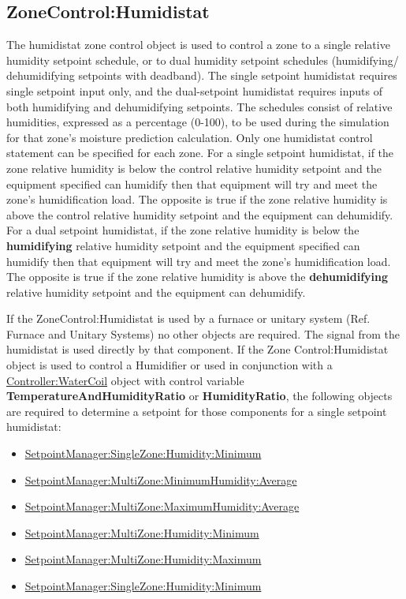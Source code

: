\subsection{ZoneControl:Humidistat}\label{zonecontrolhumidistat}

The humidistat zone control object is used to control a zone to a single relative humidity setpoint schedule, or to dual humidity setpoint schedules (humidifying/ dehumidifying setpoints with deadband). The single setpoint humidistat requires single setpoint input only, and the dual-setpoint humidistat requires inputs of both humidifying and dehumidifying setpoints. The schedules consist of relative humidities, expressed as a percentage (0-100), to be used during the simulation for that zone's moisture prediction calculation. Only one humidistat control statement can be specified for each zone. For a single setpoint humidistat, if the zone relative humidity is below the control relative humidity setpoint and the equipment specified can humidify then that equipment will try and meet the zone's humidification load. The opposite is true if the zone relative humidity is above the control relative humidity setpoint and the equipment can dehumidify. For a dual setpoint humidistat, if the zone relative humidity is below the \textbf{humidifying} relative humidity setpoint and the equipment specified can humidify then that equipment will try and meet the zone's humidification load. The opposite is true if the zone relative humidity is above the \textbf{dehumidifying} relative humidity setpoint and the equipment can dehumidify.

If the ZoneControl:Humidistat is used by a furnace or unitary system (Ref. Furnace and Unitary Systems) no other objects are required. The signal from the humidistat is used directly by that component. If the Zone Control:Humidistat object is used to control a Humidifier or used in conjunction with a \hyperref[controllerwatercoil]{Controller:WaterCoil} object with control variable \textbf{TemperatureAndHumidityRatio} or \textbf{HumidityRatio}, the following objects are required to determine a setpoint for those components for a single setpoint humidistat:

\begin{itemize}
\item
  \hyperref[setpointmanagersinglezonehumidityminimum]{SetpointManager:SingleZone:Humidity:Minimum}
\item
  \hyperref[setpointmanagermultizoneminimumhumidityaverage]{SetpointManager:MultiZone:MinimumHumidity:Average}
\item
  \hyperref[setpointmanagermultizonemaximumhumidityaverage]{SetpointManager:MultiZone:MaximumHumidity:Average}
\item
  \hyperref[setpointmanagermultizonehumidityminimum]{SetpointManager:MultiZone:Humidity:Minimum}
\item
  \hyperref[setpointmanagermultizonehumiditymaximum]{SetpointManager:MultiZone:Humidity:Maximum}
\item
  \hyperref[setpointmanagersinglezonehumidityminimum]{SetpointManager:SingleZone:Humidity:Minimum}
\end{itemize}

